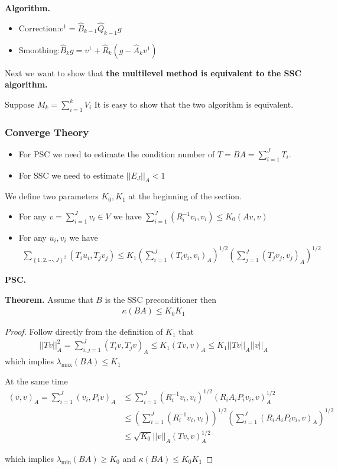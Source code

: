 \documentclass[12pt]{amsart}
\begin{document}
\textbf{Algorithm.}
\begin{itemize}
	\item Correction:$v^1=\hat B_{k-1}\hat Q_{k-1}g$
	\item Smoothing:$\hat B_kg=v^1+\hat R_k(g-\hat A_kv^1)$
\end{itemize}

Next we want to show that \textbf{the multilevel method is equivalent to the SSC algorithm.}

Suppose $M_k=\sum_{i=1}^k V_i$ It is easy to show that the two algorithm is equivalent.



\subsubsection{Converge Theory}
\begin{itemize}
	\item For PSC we need to estimate the condition number of $T=BA=\sum_{i=1}^JT_i$.
	\item For SSC we need to estimate $\left|\left|E_J\right|\right|_A<1$
\end{itemize}

We define two parameters $K_0,K_1$ at the beginning of the section.
\begin{itemize}
	\item For any $v=\sum_{i=1}^Jv_i\in V$ we have $\sum_{i=1}^J(R_i^{-1}v_i,v_i)\le K_0(Av,v)$
	\item For any $u_i,v_i$ we have
	\begin{align*}
	\sum_{\left\{1,2,\cdots,J\right\}^2} (T_iu_i,T_jv_j)\le K_1(\sum_{i=1}^J(T_iv_i,v_i)_A)^{1/2}(\sum_{j=1}^J(T_jv_j,v_j)_A)^{1/2}
	\end{align*}
\end{itemize}
\textbf{PSC.\\}

\textbf{Theorem.} Assume that $B$ is the SSC preconditioner then
\begin{align*}
\kappa(BA)\le K_0K_1
\end{align*}
\begin{proof}
	Follow directly from the definition of $K_1$ that
	\begin{align*}
	\left|\left|Tv\right|\right|_A^2=\sum_{i,j=1}^J(T_iv,T_jv)_A\le K_1(Tv,v)_A\le K_1\left|\left| Tv\right|\right|_A\left|\left|v\right|\right|_A
	\end{align*}
	which implies $\lambda_{\max}(BA)\le K_1$
	
	At the same time
	\begin{align*}
	(v,v)_A=\sum_{i=1}^J(v_i,P_iv)_A&\le\sum_{i=1}^J\left(R_i^{-1}v_i,v_i\right)^{1/2}\left(R_iA_iP_iv_i,v\right)_A^{1/2}\\
	&\le \left(\sum_{i=1}^J\left(R_i^{-1}v_i,v_i\right)\right)^{1/2}\left(\sum_{i=1}^J\left(R_iA_iP_iv_i,v\right)_A\right)^{1/2}\\
	&\le \sqrt{K_0} \left|\left|v\right|\right|_A(Tv,v)_A^{1/2}
	\end{align*}
	
	which implies $\lambda_{\min}(BA)\ge K_0$ and $\kappa(BA)\le K_0K_1$
	
\end{proof}
\end{document}
